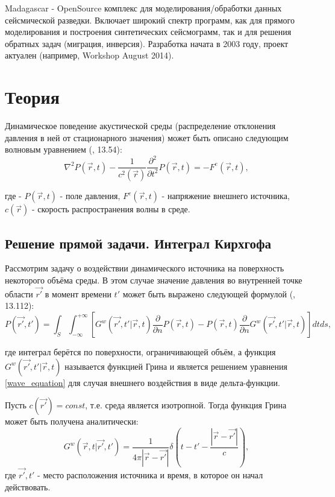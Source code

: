 \documentclass{article}
\begin{document}
Madagascar - OpenSource комплекс для моделирования/обработки данных сейсмической разведки.
Включает широкий спектр программ, как для прямого моделирования и построения синтетических сейсмограмм, так и для решения обратных задач (миграция, инверсия).
Разработка начата в 2003 году, проект актуален (например, Workshop August 2014).

\section{Теория}

Динамическое поведение акустической среды (распределение отклонения давления в ней от стационарного значения)
может быть описано следующим волновым уравнением (\cite{Zhdanov_2007}, 13.54):
\begin{equation}
\label{wave_equation}
\nabla^2P(\vec{r},t) - \frac{1}{c^2(\vec{r})}\frac{\partial^2}{\partial t^2}
	P(\vec{r},t) = - F^e(\vec{r},t),
\end{equation}

где - $P(\vec{r},t)$ - поле давления, $F^e(\vec{r},t)$ - напряжение внешнего источника, $c(\vec{r})$
- скорость распространения волны в среде.

\subsection{Решение прямой задачи. Интеграл Кирхгофа}

Рассмотрим задачу о воздействии динамического источника на поверхность некоторого объёма среды.
В этом случае значение давления во внутренней точке области $\vec{r'}$ в момент времени $t'$ может быть выражено следующей формулой (\cite{Zhdanov_2007}, 13.112):
\begin{equation}
\label{eq_kirchhoff_common}
P(\vec{r'}, t') = \int_S \int_{-\infty}^{+\infty} [G^w(\vec{r'}, t' | \vec{r}, t) \frac{\partial}
{\partial n} P(\vec{r}, t) - P(\vec{r}, t) \frac{\partial}{\partial n} G^w(\vec{r'}, t' |
\vec{r}, t)] dt ds,
\end{equation}

где интеграл берётся по поверхности, ограничивающей объём, а функция $G^w(\vec{r'}, t' | \vec{r}, t)$ называется функцией Грина и является решением уравнения \ref{wave_equation} для случая внешнего воздействия в виде дельта-функции.

Пусть $c(\vec{r'}) = const$, т.е. среда является изотропной.
Тогда функция Грина может быть получена аналитически:
\begin{equation}
\label{eq_grin_function}
G^w(\vec{r}, t | \vec{r'}, t') = \frac{1}{4\pi|\vec{r} - \vec{r'}|}\delta(t - t' - \frac{|\vec{r} -
\vec{r'}|}{c}),
\end{equation}
где $\vec{r'}, t'$ - место расположения источника и время, в которое он начал действовать.
\end{document}
